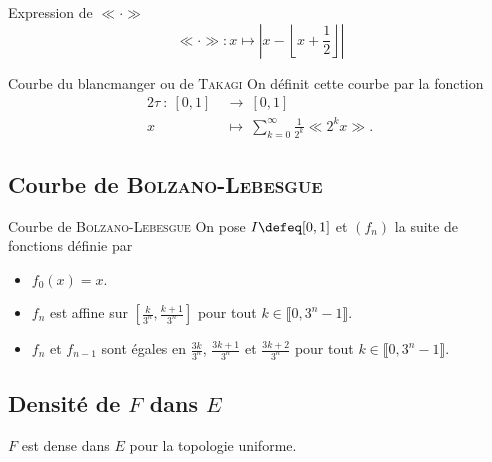 \begin{prop}{Expression de $\ll \cdot \gg$}
$$\ll \cdot \gg : x \mapsto \left| x - \left\lfloor x + \frac{1}{2} \right\rfloor \right|$$
\end{prop}

\begin{preuve}
    
\end{preuve}

\begin{defi}{Courbe du blancmanger ou de \textsc{Takagi}}
On définit cette courbe par la fonction
    \begin{alignat*}{2}
        \tau\ :\ [0,1]\ &\longrightarrow\ [0,1]\\
        x\ &\longmapsto\ \sum\limits_{k=0}^\infty \frac{1}{2^k} \ll 2^k x \gg.
    \end{alignat*}
\end{defi}

\subsection{Courbe de \textsc{Bolzano}-\textsc{Lebesgue}}    

\begin{defi}{Courbe de \textsc{Bolzano}-\textsc{Lebesgue}}
    On pose $I \defeq [0, 1]$ et $(f_n)$ la suite de fonctions définie par
    \begin{itemize}
        \item $f_0(x) = x.$
        \item $f_n$ est affine sur $\left[ \frac{k}{3^n}, \frac{k+1}{3^n} \right]$ pour tout $k \in \llbracket 0, 3^n - 1 \rrbracket$.
        \item $f_n$ et $f_{n-1}$ sont égales en $\frac{3k}{3^n}$, $\frac{3k+1}{3^n}$ et $\frac{3k+2}{3^n}$ pour tout $k \in \llbracket 0, 3^n-1 \rrbracket$.
    \end{itemize}
\end{defi}

\subsection{Densité de $F$ dans $E$}

\begin{theo}{}
    $F$ est dense dans $E$ pour la topologie uniforme.
\end{theo}

